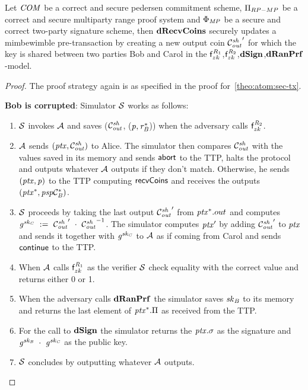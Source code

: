 \begin{theorem}
    \label{teo:atom:sec-drecv}
    Let $\mathit{COM}$ be a correct and secure pedersen commitment scheme, $\Pi_{RP-MP}$ be a correct and secure multiparty range proof system and $\Phi_{\mathit{MP}}$ be a secure and correct two-party signature scheme, then $\mathbf{dRecvCoins}$ securely updates a mimbewimble pre-transaction by creating a new output coin ${\mathcal{C}_{\mathit{out}}^{\mathit{sh}}}'$ for which the key is shared between two parties Bob and Carol in the $\mathsf{f}^{\mathit{R}_1}_{zk}$,$\mathsf{f}^{\mathit{R}_2}_{zk}$,$\mathbf{dSign}$,$\mathbf{dRanPrf}$-model.
\end{theorem}

\begin{proof}
    The proof strategy again is as specified in the proof for~\cref{theo:atom:sec-tx}.

    \textbf{Bob is corrupted}: Simulator $\mathcal{S}$ works as follows:
    \begin{enumerate}
        \item $\mathcal{S}$ invokes $\mathcal{A}$ and saves ($\mathcal{C}_{\mathit{out}}^{\mathit{sh}}$, ($\mathit{p}, \mathit{r}_{\mathit{B}}^*$)) when the adversary calls $\mathsf{f}^{\mathit{R}_2}_{zk}$.
        \item $\mathcal{A}$ sends $(\mathit{ptx},\mathcal{C}_{\mathit{out}}^{\mathit{sh}})$ to Alice.
        The simulator then compares $\mathcal{C}_{\mathit{out}}^{\mathit{sh}}$ with the values saved in its memory and sends $\mathsf{abort}$ to the TTP, halts the protocol and outputs whatever $\mathcal{A}$ outputs if they don't match.
        Otherwise, he sends $(\mathit{ptx}, \mathit{p})$ to the TTP computing $\mathsf{recvCoins}$ and receives the outputs $(\mathit{ptx}^*, \mathit{psp}\mathcal{C}_{\mathit{B}}^*)$.
        \item $\mathcal{S}$ proceeds by taking the last output ${\mathcal{C}_{\mathit{out}}^{\mathit{sh}}}'$ from $\mathit{ptx}^*.out$ and computes $\mathit{g}^{\mathit{sk}_{\mathit{C}}} ~:=~ {\mathcal{C}_{\mathit{out}}^{\mathit{sh}}}' ~\cdot~ {\mathcal{C}_{\mathit{out}}^{\mathit{sh}}}^{-1}$.
        The simulator computes ${\mathit{ptx}}'$ by adding ${\mathcal{C}_{\mathit{out}}^{\mathit{sh}}}'$ to $\mathit{ptx}$ and sends it together with $\mathit{g}^{\mathit{sk}_{\mathit{C}}}$ to $\mathcal{A}$ as if coming from Carol and sends $\mathsf{continue}$ to the TTP.
        \item When $\mathcal{A}$ calls $\mathsf{f}^{\mathit{R}_1}_{zk}$ as the verifier $\mathcal{S}$ check equality with the correct value and returns either 0 or 1.
        \item When the adversary calls $\mathbf{dRanPrf}$ the simulator saves $\mathit{sk}_{\mathit{B}}$ to its memory and returns the last element of $\mathit{ptx}^*.\Pi$ as received from the TTP.
        \item For the call to $\mathbf{dSign}$ the simulator returns the $\mathit{ptx}.\sigma$ as the signature and $\mathit{g}^{\mathit{sk}_{\mathit{B}}} ~\cdot~ \mathit{g}^{\mathit{sk}_{\mathit{C}}}$ as the public key.
        \item $\mathcal{S}$ concludes by outputting whatever $\mathcal{A}$ outputs.
    \end{enumerate}


\end{proof}
